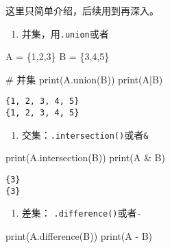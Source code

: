 \documentclass[
  letterpaper,
  DIV=11,
  numbers=noendperiod]{scrreprt}
\newenvironment{Shaded}{\begin{snugshade}}{\end{snugshade}}
\newcommand{\BuiltInTok}[1]{\textcolor[rgb]{0.00,0.23,0.31}{#1}}
\newcommand{\CommentTok}[1]{\textcolor[rgb]{0.37,0.37,0.37}{#1}}
\newcommand{\DecValTok}[1]{\textcolor[rgb]{0.68,0.00,0.00}{#1}}
\newcommand{\NormalTok}[1]{\textcolor[rgb]{0.00,0.23,0.31}{#1}}
\newcommand{\OperatorTok}[1]{\textcolor[rgb]{0.37,0.37,0.37}{#1}}
\providecommand{\tightlist}{%
  \setlength{\itemsep}{0pt}\setlength{\parskip}{0pt}}\usepackage{longtable,booktabs,array}
\begin{document}
这里只简单介绍，后续用到再深入。

\begin{enumerate}
\def\labelenumi{\arabic{enumi}.}
\tightlist
\item
  并集，用\texttt{.union}或者\texttt{\textbar{}}
\end{enumerate}

\begin{Shaded}
\begin{Highlighting}[]
\NormalTok{A }\OperatorTok{=}\NormalTok{ \{}\DecValTok{1}\NormalTok{,}\DecValTok{2}\NormalTok{,}\DecValTok{3}\NormalTok{\}}
\NormalTok{B }\OperatorTok{=}\NormalTok{ \{}\DecValTok{3}\NormalTok{,}\DecValTok{4}\NormalTok{,}\DecValTok{5}\NormalTok{\}}

\CommentTok{\# 并集}
\BuiltInTok{print}\NormalTok{(A.union(B)) }
\BuiltInTok{print}\NormalTok{(A}\OperatorTok{|}\NormalTok{B)}
\end{Highlighting}
\end{Shaded}

\begin{verbatim}
{1, 2, 3, 4, 5}
{1, 2, 3, 4, 5}
\end{verbatim}

\begin{enumerate}
\def\labelenumi{\arabic{enumi}.}
\setcounter{enumi}{1}
\tightlist
\item
  交集：\texttt{.intersection()}或者\texttt{\&}
\end{enumerate}

\begin{Shaded}
\begin{Highlighting}[]
\BuiltInTok{print}\NormalTok{(A.intersection(B))}
\BuiltInTok{print}\NormalTok{(A }\OperatorTok{\&}\NormalTok{ B) }
\end{Highlighting}
\end{Shaded}

\begin{verbatim}
{3}
{3}
\end{verbatim}

\begin{enumerate}
\def\labelenumi{\arabic{enumi}.}
\setcounter{enumi}{2}
\tightlist
\item
  差集： \texttt{.difference()}或者\texttt{-}
\end{enumerate}

\begin{Shaded}
\begin{Highlighting}[]
\BuiltInTok{print}\NormalTok{(A.difference(B))}
\BuiltInTok{print}\NormalTok{(A }\OperatorTok{{-}}\NormalTok{ B) }
\end{Highlighting}
\end{Shaded}
\end{document}
